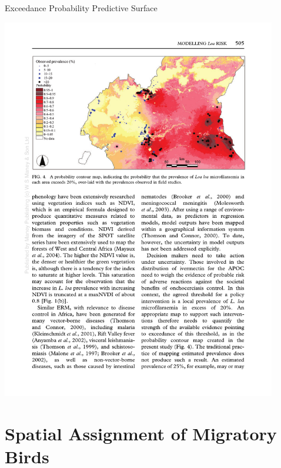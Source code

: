 \documentclass[11pt,ignorenonframetext,]{beamer}
\begin{document}
\begin{frame}{Exceedance Probability Predictive Surface}
\protect\hypertarget{exceedance-probability-predictive-surface}{}

\begin{center}
\includegraphics[width=0.9\textwidth]{figs/diggle_fig4.pdf}
\end{center}

\end{frame}

\hypertarget{spatial-assignment-of-migratory-birds}{%
\section{Spatial Assignment of Migratory
Birds}\label{spatial-assignment-of-migratory-birds}}
\end{document}
